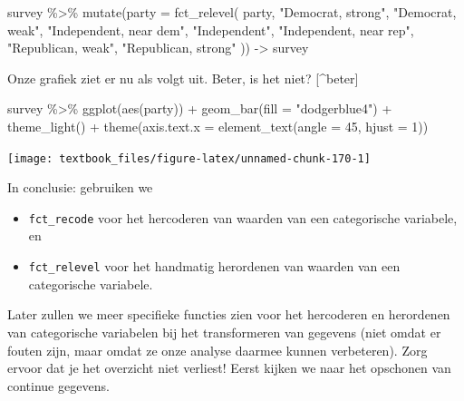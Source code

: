 \documentclass[]{tufte-book}
\newenvironment{Shaded}{}{}
\newcommand{\AttributeTok}[1]{\textcolor[rgb]{0.49,0.56,0.16}{#1}}
\newcommand{\DecValTok}[1]{\textcolor[rgb]{0.25,0.63,0.44}{#1}}
\newcommand{\FunctionTok}[1]{\textcolor[rgb]{0.02,0.16,0.49}{#1}}
\newcommand{\NormalTok}[1]{#1}
\newcommand{\OtherTok}[1]{\textcolor[rgb]{0.00,0.44,0.13}{#1}}
\newcommand{\SpecialCharTok}[1]{\textcolor[rgb]{0.25,0.44,0.63}{#1}}
\newcommand{\StringTok}[1]{\textcolor[rgb]{0.25,0.44,0.63}{#1}}
\providecommand{\tightlist}{%
  \setlength{\itemsep}{0pt}\setlength{\parskip}{0pt}}
\begin{document}
\begin{Shaded}
\begin{Highlighting}[]
\NormalTok{survey }\SpecialCharTok{\%\textgreater{}\%}
  \FunctionTok{mutate}\NormalTok{(}\AttributeTok{party =} \FunctionTok{fct\_relevel}\NormalTok{(}
\NormalTok{    party,}
    \StringTok{"Democrat, strong"}\NormalTok{,}
    \StringTok{"Democrat, weak"}\NormalTok{,}
    \StringTok{"Independent, near dem"}\NormalTok{,}
    \StringTok{"Independent"}\NormalTok{,}
    \StringTok{"Independent, near rep"}\NormalTok{,}
    \StringTok{"Republican, weak"}\NormalTok{,}
    \StringTok{"Republican, strong"}
\NormalTok{  )) }\OtherTok{{-}\textgreater{}}\NormalTok{ survey}
\end{Highlighting}
\end{Shaded}

Onze grafiek ziet er nu als volgt uit. Beter, is het niet? {[}\^{}beter{]}

\begin{Shaded}
\begin{Highlighting}[]
\NormalTok{survey }\SpecialCharTok{\%\textgreater{}\%}
  \FunctionTok{ggplot}\NormalTok{(}\FunctionTok{aes}\NormalTok{(party)) }\SpecialCharTok{+}
  \FunctionTok{geom\_bar}\NormalTok{(}\AttributeTok{fill =} \StringTok{"dodgerblue4"}\NormalTok{) }\SpecialCharTok{+}
  \FunctionTok{theme\_light}\NormalTok{() }\SpecialCharTok{+}
  \FunctionTok{theme}\NormalTok{(}\AttributeTok{axis.text.x =} \FunctionTok{element\_text}\NormalTok{(}\AttributeTok{angle =} \DecValTok{45}\NormalTok{, }\AttributeTok{hjust =} \DecValTok{1}\NormalTok{))}
\end{Highlighting}
\end{Shaded}

\texttt{[image: textbook\_files/figure-latex/unnamed-chunk-170-1]}

In conclusie: gebruiken we

\begin{itemize}
\tightlist
\item
  \texttt{fct\_recode} voor het hercoderen van waarden van een categorische variabele, en
\item
  \texttt{fct\_relevel} voor het handmatig herordenen van waarden van een categorische variabele.
\end{itemize}

Later zullen we meer specifieke functies zien voor het hercoderen en herordenen van categorische variabelen bij het transformeren van gegevens (niet omdat er fouten zijn, maar omdat ze onze analyse daarmee kunnen verbeteren). Zorg ervoor dat je het overzicht niet verliest! Eerst kijken we naar het opschonen van continue gegevens.
\end{document}
